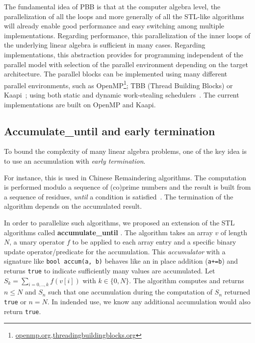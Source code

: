 \documentclass[runningheads,a4paper]{llncs}
\newcommand{\accumulatewhile}{ \textbf{accumulate\_until} }
\newcommand{\Accumulatewhile}{ \textbf{Accumulate\_until} }
\begin{document}
  
  The fundamental idea of PBB is that at the computer algebra
  level, the parallelization of all the loops and more generally of all
  the STL-like algorithms will already enable good performance and
  easy switching among multiple implementations.
  Regarding performance, this parallelization of the inner loops of
  the underlying linear algebra is sufficient in many cases.
  Regarding implementations, this
  abstraction provides for programming independent of the
  parallel model with selection of the parallel environment
  depending on the target architecture.
  The parallel blocks can be implemented using many different parallel
  environments, such as
  OpenMP\footnote{\url{openmp.org,threadingbuildingblocks.org}}; 
  TBB (Thread Building Blocks)
  \footnotemark[7] or
  Kaapi~\cite{inproceedingsgautier.gbp_ktsrsf_07}; using
  both static and dynamic work-stealing
  schedulers~\cite{con-traore.trmgb_08}.
  The current implementations are built on OpenMP and Kaapi.

\subsection{\Accumulatewhile and early termination}
To bound the complexity of many linear algebra problems, one of the
key idea is to use an accumulation with {\em early termination}.

For instance, this is used in Chinese Remaindering algorithms. The
computation is performed modulo a sequence of (co)prime numbers and
the result is built from a sequence of residues, {\em until} a
condition is satisfied~\cite{jgd:2010:crt}. 
The termination of the algorithm depends on the accumulated 
result.
  
In order to parallelize such algorithms, we proposed an extension of
the STL algorithms called \accumulatewhile.
The algorithm takes an array $v$ of length $N$, a unary
operator $f$ to be applied to each array entry and a specific binary
update operator/predicate for the accumulation.
This {\em accumulator} with a signature like \verb!bool accum(a, b)! behaves like an in place addition (\verb!a+=b!) and
returns \texttt{true} to indicate sufficiently many values are accumulated.
Let $S_k = \sum_{i=0,..,k} f( v[i])$ with 
$k \in \{0,N\}$.  The algorithm computes and returns $n \leq N$ and
$S_n$ such that one accumulation during the computation of $S_n$
returned \texttt{true} or $n = N$.  In indended use, we know any additional accumulation would also return \texttt{true}.
\end{document}
